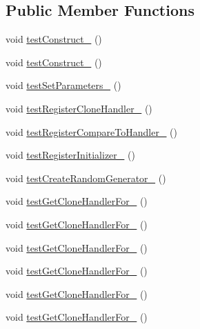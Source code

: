 \subsection*{Public Member Functions}
\begin{DoxyCompactItemize}
\item 
void \hyperlink{classorg_1_1jgap_1_1impl_1_1_j_g_a_p_factory_test_a0b43110a98894a8a114fb7a321b9d7d2}{test\-Construct\-\_} ()
\item 
void \hyperlink{classorg_1_1jgap_1_1impl_1_1_j_g_a_p_factory_test_ad94877b28040b0e3e8279df48c85b700}{test\-Construct\-\_} ()
\item 
void \hyperlink{classorg_1_1jgap_1_1impl_1_1_j_g_a_p_factory_test_a42a5fd254d31f0d5e6ba1e31aec5895b}{test\-Set\-Parameters\-\_} ()
\item 
void \hyperlink{classorg_1_1jgap_1_1impl_1_1_j_g_a_p_factory_test_ab8e459d44d6361e750815ffc733fdde2}{test\-Register\-Clone\-Handler\-\_} ()
\item 
void \hyperlink{classorg_1_1jgap_1_1impl_1_1_j_g_a_p_factory_test_ac4823bf378c8e5c92fe253530aa39b8c}{test\-Register\-Compare\-To\-Handler\-\_} ()
\item 
void \hyperlink{classorg_1_1jgap_1_1impl_1_1_j_g_a_p_factory_test_a31aa563babb4ed4730818ac7c0bb4037}{test\-Register\-Initializer\-\_} ()
\item 
void \hyperlink{classorg_1_1jgap_1_1impl_1_1_j_g_a_p_factory_test_a0bccdce9e67d1ed2dc9b2c0d9617ed35}{test\-Create\-Random\-Generator\-\_} ()
\item 
void \hyperlink{classorg_1_1jgap_1_1impl_1_1_j_g_a_p_factory_test_a8c33e30ee79bdce2af3de544aebfe9bf}{test\-Get\-Clone\-Handler\-For\-\_} ()
\item 
void \hyperlink{classorg_1_1jgap_1_1impl_1_1_j_g_a_p_factory_test_a1f8e8401efb492f80a816f1ab38e974a}{test\-Get\-Clone\-Handler\-For\-\_} ()
\item 
void \hyperlink{classorg_1_1jgap_1_1impl_1_1_j_g_a_p_factory_test_acef22cf9e2443831bc794df1f4fdc5a8}{test\-Get\-Clone\-Handler\-For\-\_} ()
\item 
void \hyperlink{classorg_1_1jgap_1_1impl_1_1_j_g_a_p_factory_test_a9b50283dd90dd15de547d69308136e37}{test\-Get\-Clone\-Handler\-For\-\_} ()
\item 
void \hyperlink{classorg_1_1jgap_1_1impl_1_1_j_g_a_p_factory_test_a052f36173ac9900b50cdc6e892541318}{test\-Get\-Clone\-Handler\-For\-\_} ()
\item 
void \hyperlink{classorg_1_1jgap_1_1impl_1_1_j_g_a_p_factory_test_ad6df7fd2d5c8cc2f0ca297c2a89c4396}{test\-Get\-Clone\-Handler\-For\-\_} ()

\end{DoxyCompactItemize}
